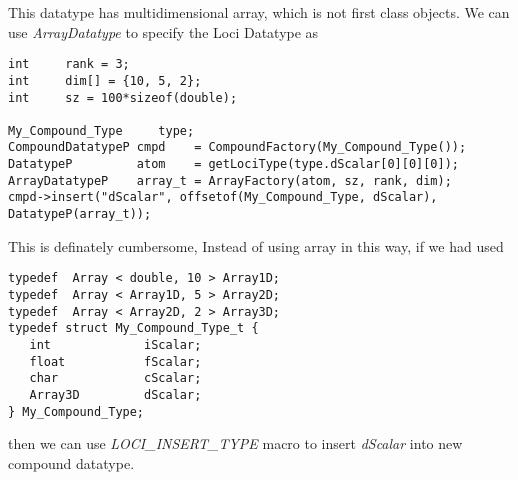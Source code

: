 %
This datatype has multidimensional array, which is not first class
objects. We can use {\em ArrayDatatype} to specify the Loci Datatype as
\begin{verbatim}
int     rank = 3;
int     dim[] = {10, 5, 2};
int     sz = 100*sizeof(double);

My_Compound_Type     type;
CompoundDatatypeP cmpd    = CompoundFactory(My_Compound_Type());
DatatypeP         atom    = getLociType(type.dScalar[0][0][0]);
ArrayDatatypeP    array_t = ArrayFactory(atom, sz, rank, dim);
cmpd->insert("dScalar", offsetof(My_Compound_Type, dScalar), DatatypeP(array_t));
\end{verbatim}

This is definately cumbersome, Instead of using array in this way, if
we had used
\begin{verbatim}
typedef  Array < double, 10 > Array1D;
typedef  Array < Array1D, 5 > Array2D;
typedef  Array < Array2D, 2 > Array3D;
typedef struct My_Compound_Type_t {
   int             iScalar;
   float           fScalar;
   char            cScalar;
   Array3D         dScalar;
} My_Compound_Type;
\end{verbatim}
then we can use {\em LOCI\_INSERT\_TYPE} macro to insert {\em
dScalar} into new compound datatype.

%
